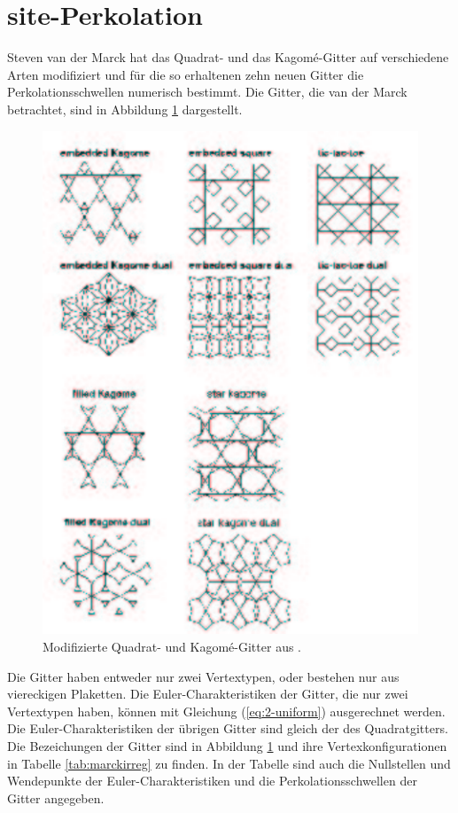 \section{site-Perkolation}
Steven van der Marck hat das Quadrat- und das Kagom\'e-Gitter auf verschiedene Arten modifiziert und f\"ur die so erhaltenen zehn neuen Gitter die Perkolationsschwellen numerisch bestimmt. Die Gitter, die van der Marck betrachtet, sind in Abbildung \ref{fig:vandermarck} dargestellt.
\begin{figure}[htbp]
  \centering
  \includegraphics{./Grenzen-Figs/vandermarck}
  \caption{Modifizierte Quadrat- und Kagom\'e-Gitter aus \cite{Marck:03}. }
  \label{fig:vandermarck}
\end{figure}
Die Gitter haben entweder nur zwei Vertextypen, oder bestehen nur aus viereckigen Plaketten. Die Euler-Charakteristiken der Gitter, die nur zwei Vertextypen haben, k\"onnen mit Gleichung (\ref{eq:2-uniform}) ausgerechnet werden. Die Euler-Charakteristiken der \"ubrigen Gitter sind gleich der des Quadratgitters. Die Bezeichungen der Gitter sind in Abbildung \ref{fig:vandermarck} und ihre Vertexkonfigurationen in Tabelle \ref{tab:marckirreg} zu finden. In der Tabelle sind auch die Nullstellen und Wendepunkte der Euler-Charakteristiken und die Perkolationsschwellen der Gitter angegeben.
